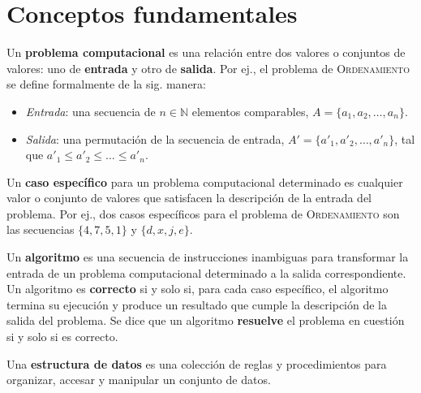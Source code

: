 \chapter{Conceptos fundamentales}

Un \textbf{problema computacional} es una relación entre dos valores o conjuntos de valores: uno de \textbf{entrada} y otro de \textbf{salida}. 
Por ej., el problema de \textsc{Ordenamiento} se define formalmente de la sig. manera:
\begin{itemize}
  \item \emph{Entrada}: una secuencia de \(n\in\mathbb{N}\) elementos comparables, \(A=\{a_1,a_2,\dots,a_n\}\).
  \item \emph{Salida}: una permutación de la secuencia de entrada, \(A'=\{a'_1,a'_2,\dots,a'_n\}\), tal que \(a'_1\leq a'_2\leq\dots\leq a'_n\).
\end{itemize}

Un \textbf{caso específico} para un problema computacional determinado es cualquier valor o conjunto de valores que satisfacen la descripción de la entrada del problema.
Por ej., dos casos específicos para el problema de \textsc{Ordenamiento} son las secuencias \(\{4,7,5,1\}\) y \(\{d,x,j,e\}\).

Un \textbf{algoritmo} es una secuencia de instrucciones inambiguas para transformar la entrada de un problema computacional determinado a la salida correspondiente.
Un algoritmo es \textbf{correcto} si y solo si, para cada caso específico, el algoritmo termina su ejecución y produce un resultado que cumple la descripción de la salida del problema.
Se dice que un algoritmo \textbf{resuelve} el problema en cuestión si y solo si es correcto.

Una \textbf{estructura de datos} es una colección de reglas y procedimientos para organizar, accesar y manipular un conjunto de datos.

